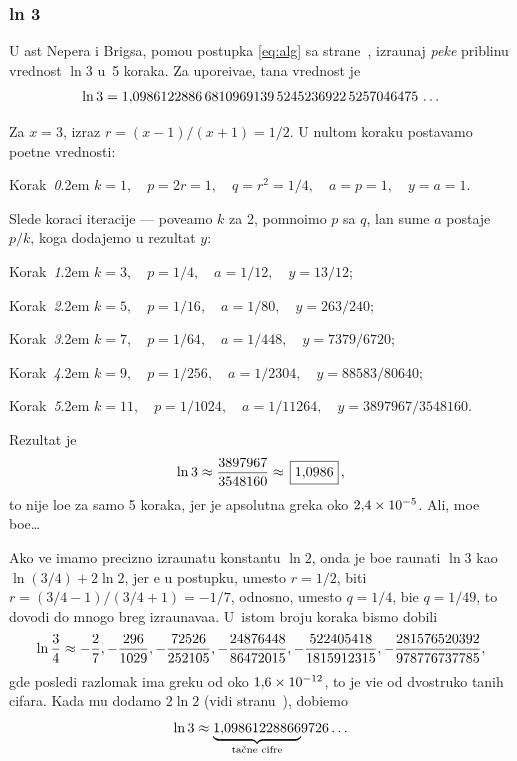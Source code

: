 \subsubsection{ln 3}\label{sssec:ln3}
 
\zadatak
U {\cv}ast Nepera i Brigsa,
pomo{\cc}u postupka \eqref{eq:alg} sa 
strane~\pageref{eq:alg},
izra{\cv}unaj {\sl pe{\sv}ke\/} pribli{\zv}nu vrednost $\ln 3$
u~5 koraka. Za upore{\dj}iva{\nj}e, ta{\cv}na vrednost je
$$
\ln3=1\.
0986122886\,
6810969139\,
5245236922\,
5257046475\,\ldots
$$

\def\step#1{\par\indent\leavevmode
  Korak~{\it#1}.\kern2em\relax}

\resenje
Za $x=3$, izraz $r=(x-1)/(x+1)=1/2$. U nultom koraku postav{\lj}amo po{\cv}etne vrednosti:

\smallskip

\step0 $k=1,\quad p=2r=1,\quad q=r^2=1/4,\quad a=p=1,\quad y=a=1$.

\smallskip

\noindent Slede koraci iteracije --- pove{\cc}amo $k$ za 2, pomno{\zv}imo $p$ sa $q$,
{\cv}lan sume $a$ postaje $p/k$, koga dodajemo u rezultat $y$:

\smallskip

\step1 $k=3,\quad p=1/4,\quad a=1/12,\quad y=13/12$;
\step2 $k=5,\quad p=1/16,\quad a=1/80,\quad y=263/240$;
\step3 $k=7,\quad p=1/64,\quad a=1/448,\quad y=7379/6720$;
\step4 $k=9,\quad p=1/256,\quad a=1/2304,\quad y=88583/80640$;
\step5 $k=11,\quad p=1/1024,\quad a=1/11264,\quad y=3897967/3548160$.

\smallskip

\noindent Rezultat je
$$
\ln3\approx\frac{3897967}{3548160}\approx \ram{1\.0986},
$$
{\sv}to nije lo{\sv}e za samo 5 koraka, jer je apsolutna gre{\sv}ka oko $2\.4\puta10^{-5}$.
Ali, mo{\zv}e bo{\lj}e\dots

\dodatak
Ako ve{\cc} imamo precizno izra{\cv}unatu konstantu $\ln2$, onda je bo{\lj}e ra{\cv}unati $\ln3$ kao $\ln(3/4)+2\ln2$,
jer {\cc}e u postupku, umesto $r=1/2$, biti $r=(3/4-1)/(3/4+1)=-1/7$, 
odnosno, umesto $q=1/4$, bi{\cc}e $q=1/49$,
{\sv}to dovodi do mnogo br{\zv}eg izra{\cv}unava{\nj}a. U~istom broju koraka bismo dobili
$$
\ln\frac34\approx
-\ff2/7, -\ff296/1029, -\ff72526/252105, -\ff24876448/86472015, 
-\ff522405418/1815912315, -\ff281576520392/978776737785,
$$
gde posled{\nj}i razlomak ima gre{\sv}ku od oko $1\.6\puta10^{-12}$,
{\sv}to je vi{\sv}e od dvostruko ta{\cv}nih cifara.
Kada mu dodamo $2\ln2$ (vidi stranu~\pageref{ln2}), dobi{\cc}emo
$$\ln3\approx \underbrace{1\.09861228866}_{\hbox{\scriptsize ta{\cv}ne cifre}}\!9726\ldots$$

